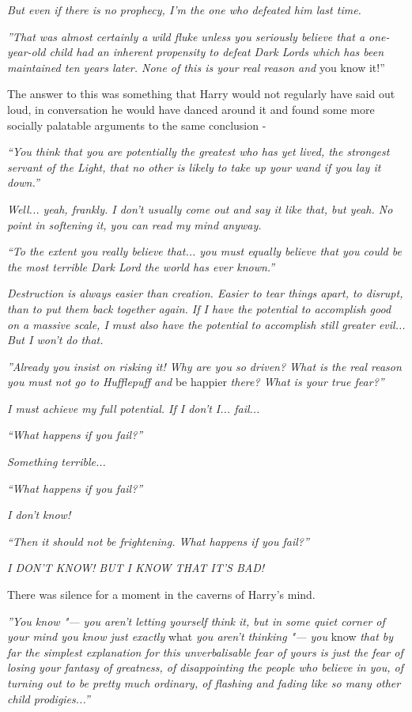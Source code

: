 \emph{But even if there is no prophecy, I'm the one who defeated him
last time.}

\emph{''That was almost certainly a wild fluke unless you seriously
believe that a one-year-old child had an inherent propensity to defeat
Dark Lords which has been maintained ten years later. None of this is
your real reason and} you know it!''

The answer to this was something that Harry would not regularly have
said out loud, in conversation he would have danced around it and found
some more socially palatable arguments to the same conclusion -

\emph{``You think that you are potentially the greatest who has yet
lived, the strongest servant of the Light, that no other is likely to
take up your wand if you lay it down.''}

\emph{Well... yeah, frankly. I don't usually come out and say it
like that, but yeah. No point in softening it, you can read my mind
anyway.}

\emph{``To the extent you really believe that... you must equally
believe that you could be the most terrible Dark Lord the world has ever
known.''}

\emph{Destruction is always easier than creation. Easier to tear things
apart, to disrupt, than to put them back together again. If I have the
potential to accomplish good on a massive scale, I must also have the
potential to accomplish still greater evil... But I won't do that.}

\emph{''Already you insist on risking it! Why are you so driven? What is
the real reason you must not go to Hufflepuff and} be happier
\emph{there? What is your true fear?''}

\emph{I must achieve my full potential. If I don't I...
fail...}

\emph{``What happens if you fail?''}

\emph{Something terrible...}

\emph{``What happens if you fail?''}

\emph{I don't know!}

\emph{``Then it should not be frightening. What happens if you fail?''}

\emph{I DON'T KNOW! BUT I KNOW THAT IT'S BAD!}

There was silence for a moment in the caverns of Harry's mind.

\emph{''You know "--- you aren't letting yourself think it, but in some
quiet corner of your mind you know just exactly} what \emph{you aren't
thinking "--- you} know \emph{that by far the simplest explanation for this
unverbalisable fear of yours is just the fear of losing your fantasy of
greatness, of disappointing the people who believe in you, of turning
out to be pretty much ordinary, of flashing and fading like so many
other child prodigies...''}

